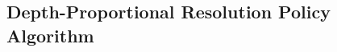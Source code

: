 \subsection{Depth-Proportional Resolution Policy Algorithm}
\label{sec:depth-proportional-resolution-algo}







